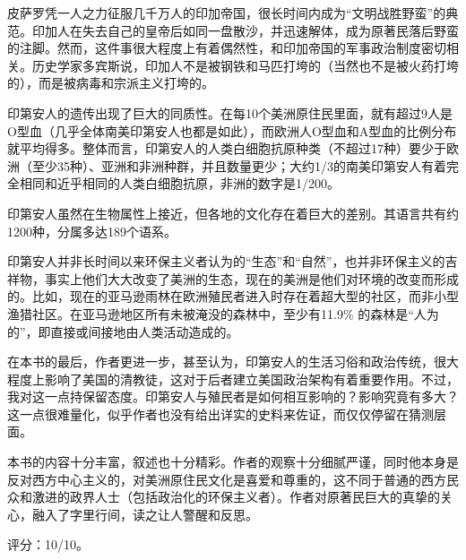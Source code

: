 皮萨罗凭一人之力征服几千万人的印加帝国，很长时间内成为“文明战胜野蛮”的典范。印加人在失去自己的皇帝后如同一盘散沙，并迅速解体，成为原著民落后野蛮的注脚。然而，这件事很大程度上有着偶然性，和印加帝国的军事政治制度密切相关。历史学家多宾斯说，印加人不是被钢铁和马匹打垮的（当然也不是被火药打垮的），而是被病毒和宗派主义打垮的。

印第安人的遗传出现了巨大的同质性。在每10个美洲原住民里面，就有超过9人是O型血（几乎全体南美印第安人也都是如此），而欧洲人O型血和A型血的比例分布就平均得多。整体而言，印第安人的人类白细胞抗原种类（不超过17种）要少于欧洲（至少35种）、亚洲和非洲种群，并且数量更少；大约1/3的南美印第安人有着完全相同和近乎相同的人类白细胞抗原，非洲的数字是1/200。

印第安人虽然在生物属性上接近，但各地的文化存在着巨大的差别。其语言共有约1200种，分属多达189个语系。

印第安人并非长时间以来环保主义者认为的“生态”和“自然”，也并非环保主义的吉祥物，事实上他们大大改变了美洲的生态，现在的美洲是他们对环境的改变而形成的。比如，现在的亚马逊雨林在欧洲殖民者进入时存在着超大型的社区，而非小型渔猎社区。在亚马逊地区所有未被淹没的森林中，至少有11.9\% 的森林是“人为的”，即直接或间接地由人类活动造成的。

在本书的最后，作者更进一步，甚至认为，印第安人的生活习俗和政治传统，很大程度上影响了美国的清教徒，这对于后者建立美国政治架构有着重要作用。不过，我对这一点持保留态度。印第安人与殖民者是如何相互影响的？影响究竟有多大？这一点很难量化，似乎作者也没有给出详实的史料来佐证，而仅仅停留在猜测层面。

本书的内容十分丰富，叙述也十分精彩。作者的观察十分细腻严谨，同时他本身是反对西方中心主义的，对美洲原住民文化是喜爱和尊重的，这不同于普通的西方民众和激进的政界人士（包括政治化的环保主义者）。作者对原著民巨大的真挚的关心，融入了字里行间，读之让人警醒和反思。

评分：10/10。